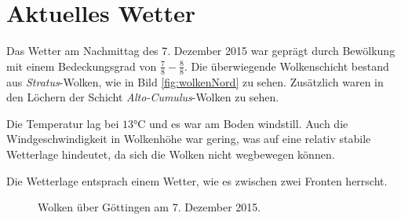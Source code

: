 \documentclass[12pt,a4paper,titlepage,headinclude,bibtotoc]{scrartcl}
\begin{document}
\section{Aktuelles Wetter}
Das Wetter am Nachmittag des 7. Dezember 2015 war geprägt durch Bewölkung mit einem Bedeckungsgrad von $\frac{7}{8}-\frac{8}{8}$.
Die überwiegende Wolkenschicht bestand aus \textit{Stratus}-Wolken, wie in Bild \ref{fig:wolkenNord} zu sehen.
Zusätzlich waren in den Löchern der Schicht \textit{Alto-Cumulus}-Wolken zu sehen.

Die Temperatur lag bei $13\si\celsius$ und es war am Boden windstill.
Auch die Windgeschwindigkeit in Wolkenhöhe war gering, was auf eine relativ stabile Wetterlage hindeutet, da sich die Wolken nicht wegbewegen können.

Die Wetterlage entsprach einem Wetter, wie es zwischen zwei Fronten herrscht.

\begin{figure}[h]
  \centering
  \hfill
  \caption{Wolken über Göttingen am 7. Dezember 2015.}
  \label{fig:label-gesamt}
\end{figure}
\end{document}
